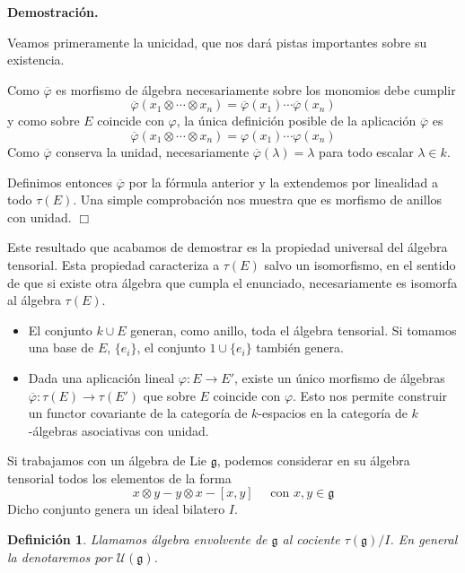 \documentclass[a4paper,draft,12pt]{scrartcl}
\newtheorem{defi}{Definición}[section]%
\newcommand{\dem}{\noindent \textbf{Demostración. }\vspace{0.3 cm}}%
\newcommand{\uni}{\mathcal{U}}%
\newcommand{\fin}{ $\Box $ \vspace{0.4 cm}}
\newcommand{\df}[1]{\textsf{\color{blue}#1}}
\begin{document}
\dem

Veamos primeramente la unicidad, que nos dará pistas importantes sobre su existencia.

Como $\overline{\varphi}$ es morfismo de álgebra necesariamente sobre los monomios debe cumplir
$$
\overline{\varphi}(x_1\otimes \cdots\otimes x_n)= \overline{\varphi}(x_1) \cdots \overline{\varphi}(x_n)
$$
y como sobre $E$ coincide con $\varphi$, la única definición posible de la aplicación $\overline{\varphi}$ es
$$
\overline{\varphi}(x_1\otimes \cdots\otimes x_n)= \varphi(x_1) \cdots \varphi(x_n)
$$
Como $\overline{\varphi}$ conserva la unidad, necesariamente $\overline{\varphi}(\lambda)=\lambda$ para todo escalar $\lambda \in k$.

Definimos entonces $\overline{ \varphi}$ por la fórmula anterior y la extendemos por linealidad a todo $\tau(E)$.  Una simple comprobación nos muestra que es morfismo de anillos con unidad. \fin

Este resultado que acabamos de demostrar es la  \df{propiedad universal} del álgebra tensorial.  Esta propiedad caracteriza a $\tau(E)$ salvo un isomorfismo, en el sentido de que si existe otra álgebra que cumpla el enunciado, necesariamente es isomorfa al álgebra $\tau(E)$.

\bigskip


\begin{itemize}

\item El conjunto $k \cup E$ generan, como anillo, toda el álgebra tensorial.  Si tomamos una base de $E$, $\{e_i\}$, el conjunto $1 \cup \{e_i\}$ también genera.

\item  Dada una aplicación lineal $\varphi: E \rightarrow E'$, existe un único morfismo de álgebras $\overline{\varphi}: \tau(E) \rightarrow \tau(E')$ que sobre $E$ coincide con $\varphi$.  Esto nos permite construir un functor covariante de la categoría de $k$-espacios en la categoría de $k$-álgebras asociativas con unidad.

\end{itemize}


Si trabajamos con un álgebra de Lie $\mathfrak{g}$, podemos considerar en su álgebra tensorial todos los elementos de la forma
$$
x\otimes y - y \otimes x -[x,y] \quad\text{ con } x,y \in \mathfrak{g}
$$
Dicho conjunto genera un ideal bilatero $I$.


\begin{defi}

Llamamos  \df{álgebra envolvente}  de $\mathfrak{g}$ al cociente $\tau(\mathfrak{g})/I$.  En general la denotaremos por $\uni(\mathfrak{g})$.

\end{defi}
\end{document}

